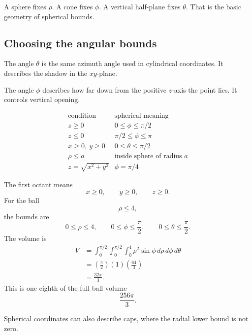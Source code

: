 A sphere fixes \(\rho\).  A cone fixes \(\phi\).  A vertical half-plane fixes \(\theta\).
That is the basic geometry of spherical bounds.

\subsection{Choosing the angular bounds}

The angle \(\theta\) is the same azimuth angle used in cylindrical coordinates.  It
describes the shadow in the \(xy\)-plane.

The angle \(\phi\) describes how far down from the positive \(z\)-axis the point lies.
It controls vertical opening.

\[
\begin{array}{c|c}
\text{condition} & \text{spherical meaning} \\ \hline
z\ge0 & 0\le\phi\le\pi/2\\[1mm]
z\le0 & \pi/2\le\phi\le\pi\\[1mm]
x\ge0,\ y\ge0 & 0\le\theta\le\pi/2\\[1mm]
\rho\le a & \text{inside sphere of radius }a\\[1mm]
z=\sqrt{x^2+y^2} & \phi=\pi/4
\end{array}
\]

\begin{example}
The first octant means
\[
    x\ge0,\qquad y\ge0,\qquad z\ge0.
\]
For the ball
\[
    \rho\le4,
\]
the bounds are
\[
    0\le\rho\le4,
    \qquad
    0\le\phi\le\frac{\pi}{2},
    \qquad
    0\le\theta\le\frac{\pi}{2}.
\]
The volume is
\[
\begin{aligned}
V
&=
\int_0^{\pi/2}\int_0^{\pi/2}\int_0^4
\rho^2\sin\phi\,d\rho\,d\phi\,d\theta\\
&=
\left(\frac{\pi}{2}\right)(1)\left(\frac{64}{3}\right)\\
&=
\frac{32\pi}{3}.
\end{aligned}
\]
This is one eighth of the full ball volume
\[
    \frac{256\pi}{3}.
\]
\end{example}

Spherical coordinates can also describe caps, where the radial lower bound is not zero.

